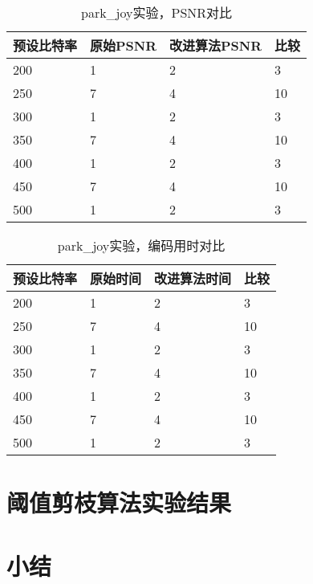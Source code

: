 \begin{table}[H]
  \centering
    \caption{park\_joy实验，PSNR对比}
    \label{tab:result-weighted-park-psnr}
    \begin{tabularx}{\linewidth}{XXXX}
      \toprule[1.5pt]
      预设比特率 & 原始PSNR & 改进算法PSNR & 比较 \\
      \midrule[1pt]
      200 & 1 & 2 & 3  \\
      250 & 7 & 4 & 10 \\
      300 & 1 & 2 & 3  \\
      350 & 7 & 4 & 10 \\
      400 & 1 & 2 & 3  \\
      450 & 7 & 4 & 10 \\
      500 & 1 & 2 & 3  \\
      \bottomrule[1.5pt]
    \end{tabularx}
\end{table}

\begin{table}[H]
  \centering
    \caption{park\_joy实验，编码用时对比}
    \label{tab:result-weighted-park-time}
    \begin{tabularx}{\linewidth}{XXXX}
      \toprule[1.5pt]
      预设比特率 & 原始时间 & 改进算法时间 & 比较 \\
      \midrule[1pt]
      200 & 1 & 2 & 3  \\
      250 & 7 & 4 & 10 \\
      300 & 1 & 2 & 3  \\
      350 & 7 & 4 & 10 \\
      400 & 1 & 2 & 3  \\
      450 & 7 & 4 & 10 \\
      500 & 1 & 2 & 3  \\
      \bottomrule[1.5pt]
    \end{tabularx}
\end{table}


\section{阈值剪枝算法实验结果}

\section{小结}
